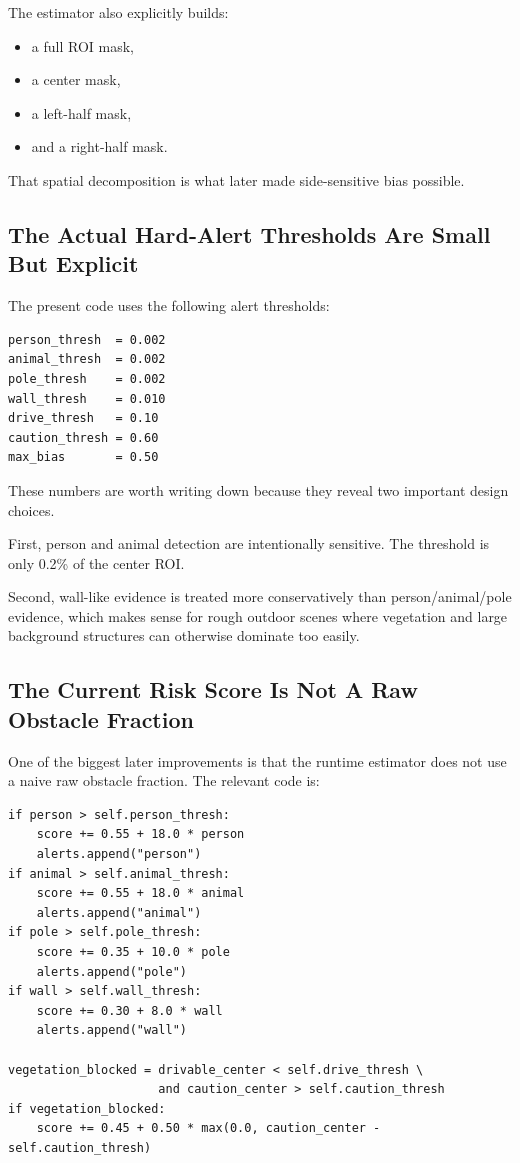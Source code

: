 \documentclass[11pt]{article}
\begin{document}
The estimator also explicitly builds:
\begin{itemize}[leftmargin=*]
\item a full ROI mask,
\item a center mask,
\item a left-half mask,
\item and a right-half mask.
\end{itemize}

That spatial decomposition is what later made side-sensitive bias possible.

\subsection{The Actual Hard-Alert Thresholds Are Small But Explicit}
The present code uses the following alert thresholds:
\begin{verbatim}
person_thresh  = 0.002
animal_thresh  = 0.002
pole_thresh    = 0.002
wall_thresh    = 0.010
drive_thresh   = 0.10
caution_thresh = 0.60
max_bias       = 0.50
\end{verbatim}

These numbers are worth writing down because they reveal two important design choices.

First, person and animal detection are intentionally sensitive. The threshold is only 0.2\% of the center ROI.

Second, wall-like evidence is treated more conservatively than person/animal/pole evidence, which makes sense for rough outdoor scenes where vegetation and large background structures can otherwise dominate too easily.

\subsection{The Current Risk Score Is Not A Raw Obstacle Fraction}
One of the biggest later improvements is that the runtime estimator does not use a naive raw obstacle fraction. The relevant code is:
\begin{verbatim}
if person > self.person_thresh:
    score += 0.55 + 18.0 * person
    alerts.append("person")
if animal > self.animal_thresh:
    score += 0.55 + 18.0 * animal
    alerts.append("animal")
if pole > self.pole_thresh:
    score += 0.35 + 10.0 * pole
    alerts.append("pole")
if wall > self.wall_thresh:
    score += 0.30 + 8.0 * wall
    alerts.append("wall")

vegetation_blocked = drivable_center < self.drive_thresh \
                     and caution_center > self.caution_thresh
if vegetation_blocked:
    score += 0.45 + 0.50 * max(0.0, caution_center - self.caution_thresh)
\end{verbatim}
\end{document}
